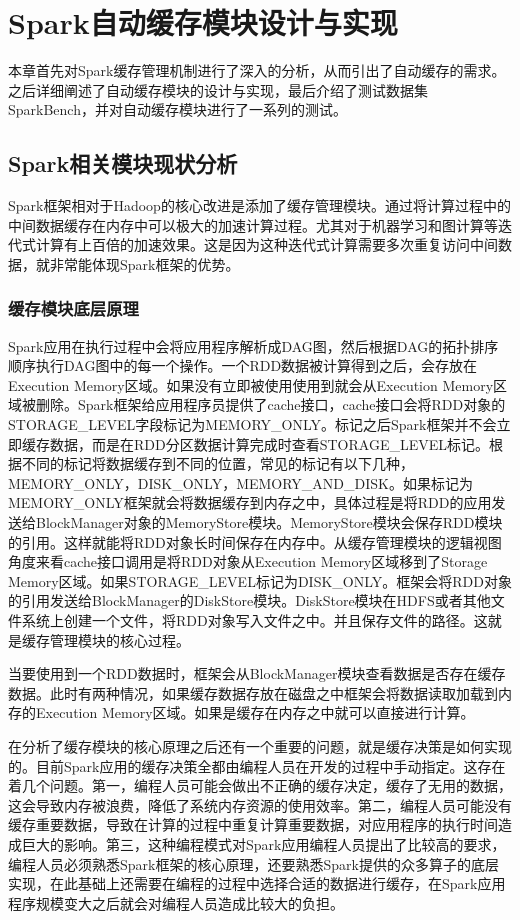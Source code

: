 \chapter{Spark自动缓存模块设计与实现}\label{chap:auto-cache}

本章首先对Spark缓存管理机制进行了深入的分析，从而引出了自动缓存的需求。之后详细阐述了自动缓存模块的设计与实现，最后介绍了测试数据集SparkBench，并对自动缓存模块进行了一系列的测试。

\section{Spark相关模块现状分析}
Spark框架相对于Hadoop的核心改进是添加了缓存管理模块。通过将计算过程中的中间数据缓存在内存中可以极大的加速计算过程。尤其对于机器学习和图计算等迭代式计算有上百倍的加速效果。这是因为这种迭代式计算需要多次重复访问中间数据，就非常能体现Spark框架的优势。

\subsection{缓存模块底层原理}
Spark应用在执行过程中会将应用程序解析成DAG图，然后根据DAG的拓扑排序顺序执行DAG图中的每一个操作。一个RDD数据被计算得到之后，会存放在Execution Memory区域。如果没有立即被使用使用到就会从Execution Memory区域被删除。Spark框架给应用程序员提供了cache接口，cache接口会将RDD对象的STORAGE\_LEVEL字段标记为MEMORY\_ONLY。标记之后Spark框架并不会立即缓存数据，而是在RDD分区数据计算完成时查看STORAGE\_LEVEL标记。根据不同的标记将数据缓存到不同的位置，常见的标记有以下几种，MEMORY\_ONLY，DISK\_ONLY，MEMORY\_AND\_DISK。如果标记为MEMORY\_ONLY框架就会将数据缓存到内存之中，具体过程是将RDD的应用发送给BlockManager对象的MemoryStore模块。MemoryStore模块会保存RDD模块的引用。这样就能将RDD对象长时间保存在内存中。从缓存管理模块的逻辑视图角度来看cache接口调用是将RDD对象从Execution Memory区域移到了Storage Memory区域。如果STORAGE\_LEVEL标记为DISK\_ONLY。框架会将RDD对象的引用发送给BlockManager的DiskStore模块。DiskStore模块在HDFS或者其他文件系统上创建一个文件，将RDD对象写入文件之中。并且保存文件的路径。这就是缓存管理模块的核心过程。

当要使用到一个RDD数据时，框架会从BlockManager模块查看数据是否存在缓存数据。此时有两种情况，如果缓存数据存放在磁盘之中框架会将数据读取加载到内存的Execution Memory区域。如果是缓存在内存之中就可以直接进行计算。

在分析了缓存模块的核心原理之后还有一个重要的问题，就是缓存决策是如何实现的。目前Spark应用的缓存决策全都由编程人员在开发的过程中手动指定。这存在着几个问题。第一，编程人员可能会做出不正确的缓存决定，缓存了无用的数据，这会导致内存被浪费，降低了系统内存资源的使用效率。第二，编程人员可能没有缓存重要数据，导致在计算的过程中重复计算重要数据，对应用程序的执行时间造成巨大的影响。第三，这种编程模式对Spark应用编程人员提出了比较高的要求，编程人员必须熟悉Spark框架的核心原理，还要熟悉Spark提供的众多算子的底层实现，在此基础上还需要在编程的过程中选择合适的数据进行缓存，在Spark应用程序规模变大之后就会对编程人员造成比较大的负担。

